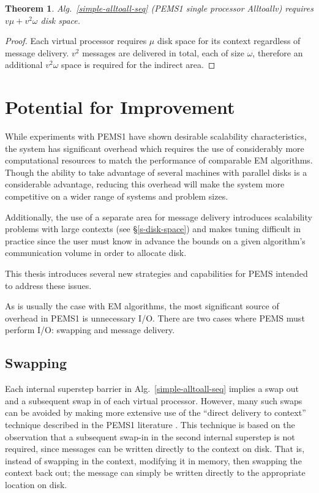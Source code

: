 \documentclass[12pt]{carletoncsthesis}
\newtheorem{thm}{Theorem}[section]
\begin{document}
\begin{thm}
\label{simple-alltoall-seq-mem}
Alg.~\ref{simple-alltoall-seq} (PEMS1 single processor {\sc Alltoallv})
requires $v\mu + v^2\omega$ disk space.
\end{thm}
\begin{proof}
Each virtual processor requires $\mu$ disk space for its context regardless
of message delivery.  $v^2$ messages are delivered in total, each of size
$\omega$, therefore an additional $v^2\omega$ space is required for the
indirect area.
\end{proof}

\section{Potential for Improvement}
\label{potential}


While experiments with PEMS1 have shown desirable scalability characteristics,
the system has significant overhead which requires the use of considerably more
computational resources to match the performance of comparable EM algorithms.
Though the ability to take advantage of several machines with parallel disks
is a considerable advantage, reducing this overhead will make the system
more competitive on a wider range of systems and problem sizes.

Additionally, the use of a separate area for message delivery introduces
scalability problems with large contexts (see \S\ref{s-disk-space})
and makes tuning difficult in practice since the user must know in advance
the bounds on a given algorithm's communication volume in order to allocate
disk.

This thesis introduces several new strategies and capabilities for PEMS
intended to address these issues.

As is usually the case with EM algorithms, the most significant source
of overhead in PEMS1 is unnecessary I/O.  There are two cases where PEMS
must perform I/O: swapping and message delivery.

\subsection{Swapping}
\label{improvements-swap}


Each internal superstep barrier in Alg.~\ref{simple-alltoall-seq} implies a
swap out and a subsequent swap in of each virtual processor.  However, many
such swaps can be avoided by making more extensive use of the ``direct delivery
to context'' technique described in the PEMS1 literature \cite{mnthesis}.
This technique is based on the observation that a subsequent swap-in in
the second internal superstep is not required, since messages can be written
directly to the context on disk.  That is, instead of swapping in the context,
modifying it in memory, then swapping the context back out; the message can
simply be written directly to the appropriate location on disk.
\end{document}
